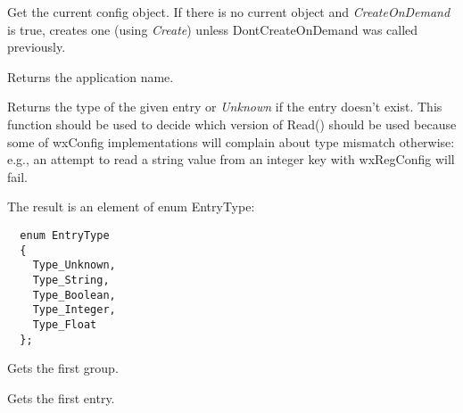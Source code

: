 Get the current config object. If there is no current object and
{\it CreateOnDemand} is true, creates one
(using {\it Create}) unless DontCreateOnDemand was called previously.


\label{wxconfigbasegetappname}


Returns the application name.


\label{wxconfigbasegetentrytype}


Returns the type of the given entry or {\it Unknown} if the entry doesn't
exist. This function should be used to decide which version of Read() should
be used because some of wxConfig implementations will complain about type
mismatch otherwise: e.g., an attempt to read a string value from an integer
key with wxRegConfig will fail.

The result is an element of enum EntryType:

\begin{verbatim}
  enum EntryType
  {
    Type_Unknown,
    Type_String,
    Type_Boolean,
    Type_Integer,
    Type_Float
  };
\end{verbatim}


\label{wxconfigbasegetfirstgroup}


Gets the first group.




\label{wxconfigbasegetfirstentry}


Gets the first entry.



